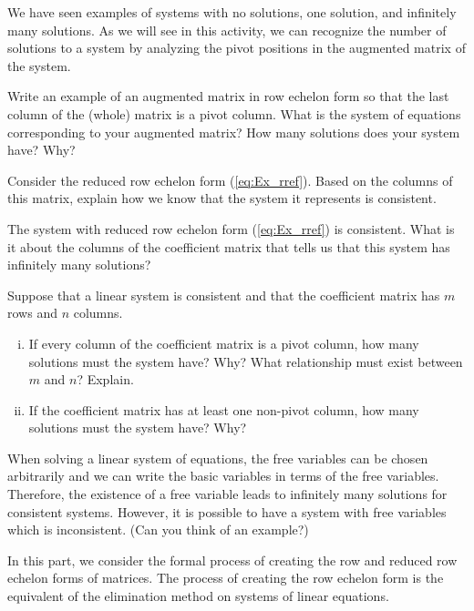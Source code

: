 \begin{activity} \label{act:1_c_2} We have seen examples of systems with no solutions, one solution, and infinitely many solutions. As we will see in this activity, we can recognize the number of solutions to a system by analyzing the pivot positions in the augmented matrix of the system.  
    \ba
    \item Write an example of an augmented matrix in row echelon form so that the last column of the (whole) matrix is a pivot column. What is the system of equations corresponding to your augmented matrix? How many solutions does your system have? Why? 
		

    \item Consider the reduced row echelon form (\ref{eq:Ex_rref}). Based on the columns of this matrix, explain how we know that the system it represents is consistent. 

	\item The system with reduced row echelon form (\ref{eq:Ex_rref}) is consistent. What is it about the columns of the coefficient matrix that tells us that this system has infinitely many solutions? 

     \item Suppose that a linear system is consistent and that the coefficient matrix has $m$ rows and $n$ columns. 
		\begin{enumerate}[i.]
		\item If every column of the coefficient matrix is a pivot column, how many solutions must the system have? Why? What relationship must exist between $m$ and $n$? Explain.
		\item If the coefficient matrix has at least one non-pivot column, how many solutions must the system have? Why? 
		\end{enumerate}

    \ea

\end{activity}


When solving a linear system of equations, the free variables can be chosen arbitrarily and we can write the basic variables in terms of the free variables. Therefore, the existence of a free variable leads to infinitely many solutions for consistent systems. However, it is possible to have a system with free variables which is inconsistent. (Can you think of an example?)


In this part, we consider the formal process of creating the row and reduced row echelon forms of matrices. The process of creating the row echelon form is the equivalent of the elimination method on systems of linear equations.

